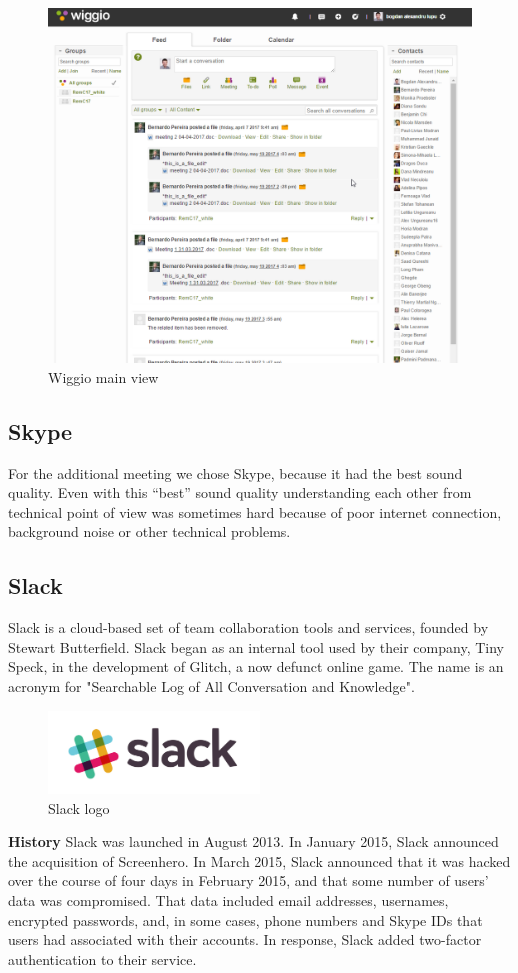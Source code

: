 \begin{figure}[h]
\centering
\caption{Wiggio main view}
\includegraphics[width=\textwidth]{images/wiggio.png}
\end{figure}

\subsection{Skype}
For the additional meeting we chose Skype, because it had the best sound quality. Even with this “best” sound quality understanding each other from technical point of view was sometimes hard because of poor internet connection, background noise or other technical problems.

\subsection{Slack}
Slack is a cloud-based set of team collaboration tools and services, founded by Stewart Butterfield. Slack began as an internal tool used by their company, Tiny Speck, in the development of Glitch, a now defunct online game. The name is an acronym for "Searchable Log of All Conversation and Knowledge".
\begin{figure}[h]
	\centering
	\caption{Slack logo}
	\includegraphics[width=0.5\textwidth]{images/slack_logo.png}
\end{figure}
\textbf{History}
Slack was launched in August 2013. In January 2015, Slack announced the acquisition of Screenhero.
In March 2015, Slack announced that it was hacked over the course of four days in February 2015, and that some number of users’ data was compromised. That data included email addresses, usernames, encrypted passwords, and, in some cases, phone numbers and Skype IDs that users had associated with their accounts. In response, Slack added two-factor authentication to their service.

